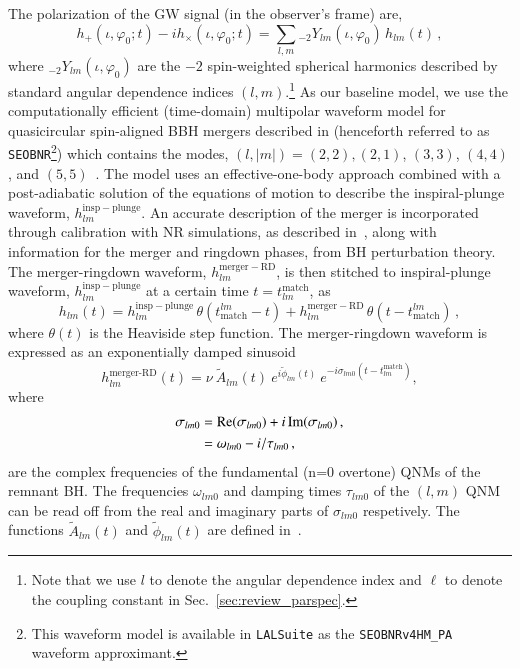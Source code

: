 \documentclass[twocolumn,
               prd,
               aps,
               superscriptaddress,
               tightenlines,
               nofootinbib,
               eqsecnum,
               amsfonts,
               amsmath,
               longbibliography]{revtex4-1}
\newcommand{\SEOB}{\texttt{SEOBNR}}
\begin{document}
The polarization of the GW signal (in the observer's frame) are,
%
\begin{equation}
h_+(\iota,\varphi_0;t ) - i h_\times(\iota,\varphi_0;t) = \sum_{l, m} {}_{-\!2}Y_{l m}(\iota,\varphi_0)\, h_{l m}(t)\,,
\end{equation}
%
where ${}_{-\!2}Y_{l m}(\iota,\varphi_0)$ are the $-2$ spin-weighted spherical harmonics described by standard angular dependence indices $(l,m)$.\footnote{Note that we use $l$ to denote the angular dependence index and $\ell$ to denote the coupling constant in Sec.~\ref{sec:review_parspec}.} As our baseline model, we use the computationally efficient (time-domain) multipolar waveform model for quasicircular spin-aligned BBH mergers described in \cite{Mihaylov:2021bpf} (henceforth referred to as \SEOB{}\footnote{This waveform model is available in \texttt{LALSuite} \cite{lalsuite} as the \texttt{SEOBNRv4HM\_PA} waveform approximant.}) which contains the modes, $(l, |m|)=(2,2),(2,1)$, $(3,3)$, $(4,4)$, and $(5,5)$~\cite{Cotesta:2018fcv,Mihaylov:2021bpf}. The model uses an effective-one-body approach combined with a post-adiabatic solution of the equations of motion to describe the inspiral-plunge waveform, $h_{l m}^\mathrm{insp-plunge}$. An accurate description of the merger is incorporated through calibration with NR simulations, as described in~\cite{Cotesta:2018fcv}, along with information for the merger and ringdown phases, from BH perturbation theory. The merger-ringdown waveform, $h_{l m}^\mathrm{merger-RD}$, is then stitched to inspiral-plunge waveform, $h_{l m}^\mathrm{insp-plunge}$ at a certain time $t = t^{\textrm{match}}_{l m}$, as
%
\begin{equation}
h_{l m}(t) = h_{l m}^\mathrm{insp-plunge}\, \theta(t_\mathrm{match}^{l m} - t) + h_{l m}^\mathrm{merger-RD}\,\theta(t-t_\mathrm{match}^{l m})\,,
\end{equation}
%
where $\theta(t)$ is the Heaviside step function. The merger-ringdown waveform is expressed as an exponentially damped sinusoid ~\citep{Bohe:2016gbl,Cotesta:2018fcv,Mihaylov:2021bpf}
%
\begin{equation}
\label{RD}
h_{l m}^{\textrm{merger-RD}}(t) = \nu \ \tilde{A}_{l m}(t)\ e^{i \tilde{\phi}_{l m}(t)} \ e^{-i \sigma_{l m 0}(t-t^{\textrm{match}}_{l m})},
\end{equation}
%
where
%
\begin{align}
\sigma_{l m 0} &= {\rm Re}(\sigma_{l m 0}) + i \, {\rm Im}(\sigma_{l m 0})\,,
\nonumber \\
&= \omega_{l m 0} - i / \tau_{l m 0}\,,
\end{align}
%
are the complex frequencies of the fundamental (n=0 overtone) QNMs of the remnant BH. The frequencies $\omega_{l m 0}$ and damping times $\tau_{l m 0}$ of the $(l, m)$ QNM can be read off from the real and imaginary parts of  $\sigma_{l m0}$ respetively. The functions $\tilde{A}_{l m}(t)$ and $\tilde{\phi}_{l m}(t)$ are defined in~\cite{Bohe:2016gbl,Cotesta:2018fcv}.
\end{document}
